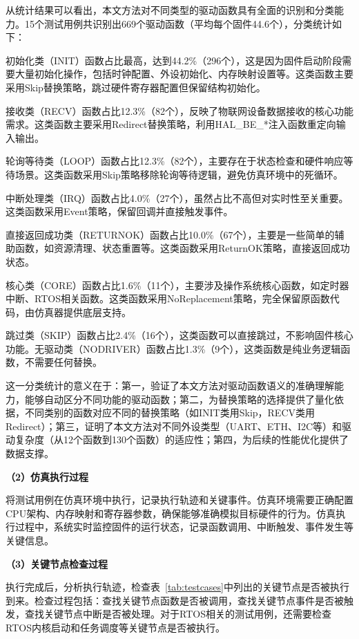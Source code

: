 从统计结果可以看出，本文方法对不同类型的驱动函数具有全面的识别和分类能力。15个测试用例共识别出669个驱动函数（平均每个固件44.6个），分类统计如下：

初始化类（INIT）函数占比最高，达到44.2\%（296个），这是因为固件启动阶段需要大量初始化操作，包括时钟配置、外设初始化、内存映射设置等。这类函数主要采用Skip替换策略，跳过硬件寄存器配置但保留结构初始化。

接收类（RECV）函数占比12.3\%（82个），反映了物联网设备数据接收的核心功能需求。这类函数主要采用Redirect替换策略，利用HAL\_BE\_*注入函数重定向输入输出。

轮询等待类（LOOP）函数占比12.3\%（82个），主要存在于状态检查和硬件响应等待场景。这类函数采用Skip策略移除轮询等待逻辑，避免仿真环境中的死循环。

中断处理类（IRQ）函数占比4.0\%（27个），虽然占比不高但对实时性至关重要。这类函数采用Event策略，保留回调并直接触发事件。

直接返回成功类（RETURNOK）函数占比10.0\%（67个），主要是一些简单的辅助函数，如资源清理、状态重置等。这类函数采用ReturnOK策略，直接返回成功状态。

核心类（CORE）函数占比1.6\%（11个），主要涉及操作系统核心函数，如定时器中断、RTOS相关函数。这类函数采用NoReplacement策略，完全保留原函数代码，由仿真器提供底层支持。

跳过类（SKIP）函数占比2.4\%（16个），这类函数可以直接跳过，不影响固件核心功能。无驱动类（NODRIVER）函数占比1.3\%（9个），这类函数是纯业务逻辑函数，不需要任何替换。

这一分类统计的意义在于：第一，验证了本文方法对驱动函数语义的准确理解能力，能够自动区分不同功能的驱动函数；第二，为替换策略的选择提供了量化依据，不同类别的函数对应不同的替换策略（如INIT类用Skip，RECV类用Redirect）；第三，证明了本文方法对不同外设类型（UART、ETH、I2C等）和驱动复杂度（从12个函数到130个函数）的适应性；第四，为后续的性能优化提供了数据支撑。

\textbf{（2）仿真执行过程}

将测试用例在仿真环境中执行，记录执行轨迹和关键事件。仿真环境需要正确配置CPU架构、内存映射和寄存器参数，确保能够准确模拟目标硬件的行为。仿真执行过程中，系统实时监控固件的运行状态，记录函数调用、中断触发、事件发生等关键信息。

\textbf{（3）关键节点检查过程}

执行完成后，分析执行轨迹，检查表~\ref{tab:testcases}中列出的关键节点是否被执行到来。检查过程包括：查找关键节点函数是否被调用，查找关键节点事件是否被触发，查找关键节点中断是否被处理。对于RTOS相关的测试用例，还需要检查RTOS内核启动和任务调度等关键节点是否被执行。

